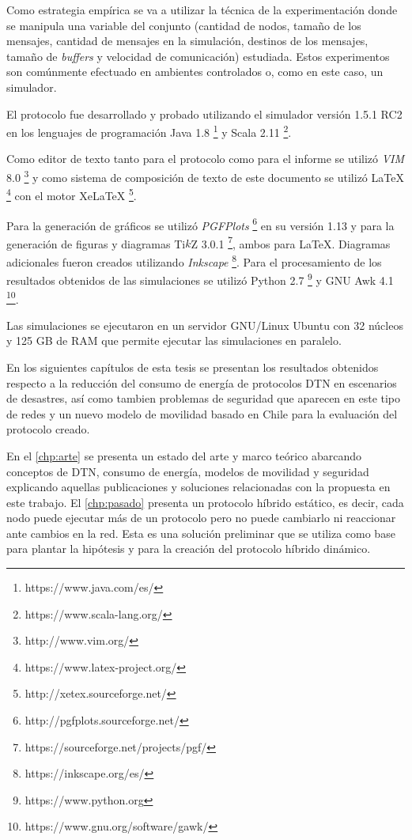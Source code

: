 Como estrategia empírica se va a utilizar la técnica de la experimentación
\cite{wohlin_experimentation_2012} donde se manipula una variable  del conjunto
(cantidad de nodos, tamaño de los mensajes, cantidad de mensajes en la
simulación, destinos de los mensajes, tamaño de \textit{buffers} y velocidad de
comunicación) estudiada. Estos experimentos son comúnmente efectuado en
ambientes controlados o, como en este caso, un simulador.




El protocolo fue desarrollado y probado utilizando el simulador \theone{}
\cite{keranen_one_2009} versión 1.5.1 RC2 en los lenguajes de programación Java
1.8 \footnote{https://www.java.com/es/} y Scala 2.11
\footnote{https://www.scala-lang.org/}. 


Como editor de texto tanto para el protocolo como para el informe se utilizó
\textit{VIM} 8.0 \footnote{http://www.vim.org/} y como sistema de composición de
texto de este documento se utilizó \LaTeX
\footnote{https://www.latex-project.org/} con el motor XeLaTeX
\footnote{http://xetex.sourceforge.net/}.

Para la generación de gráficos se utilizó \textit{PGFPlots}
\footnote{http://pgfplots.sourceforge.net/} en su versión 1.13 y para la
generación de figuras y diagramas Ti$k$Z 3.0.1
\footnote{https://sourceforge.net/projects/pgf/}, ambos para \LaTeX. Diagramas
adicionales fueron creados utilizando \textit{Inkscape}
\footnote{https://inkscape.org/es/}. Para el procesamiento de los resultados
obtenidos de las simulaciones se utilizó Python 2.7
\footnote{https://www.python.org} y GNU Awk 4.1
\footnote{https://www.gnu.org/software/gawk/}.

Las simulaciones se ejecutaron en un servidor GNU/Linux Ubuntu con 32 núcleos y
125 GB de RAM que permite ejecutar las simulaciones en paralelo.



En los siguientes capítulos de esta tesis se presentan los resultados obtenidos
respecto a la reducción del consumo de energía de protocolos DTN en escenarios
de desastres, así como tambien problemas de seguridad que aparecen en este tipo
de redes y un nuevo modelo de movilidad basado en Chile para la evaluación del
protocolo creado.

En el \ref{chp:arte} se presenta un estado del arte y marco teórico abarcando
conceptos de DTN, consumo de energía, modelos de movilidad y seguridad
explicando aquellas publicaciones y soluciones relacionadas con la propuesta en
este trabajo. El \ref{chp:pasado} presenta un protocolo híbrido estático, es
decir, cada nodo puede ejecutar más de un protocolo pero no puede cambiarlo ni
reaccionar ante cambios en la red. Esta es una solución preliminar que se
utiliza como base para plantar la hipótesis y para la creación del protocolo
híbrido dinámico.

